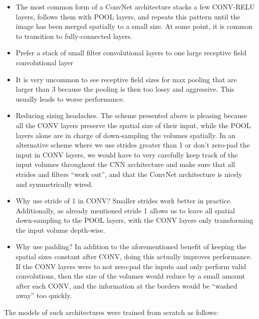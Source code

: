 \begin{itemize}
    \item The most common form of a ConvNet architecture stacks a few CONV-RELU layers, follows them with POOL layers, and repeats this pattern until the image has been merged spatially to a small size. At some point, it is common to transition to fully-connected layers.
    \item Prefer a stack of small filter convolutional layers to one large receptive field convolutional layer
    \item It is very uncommon to see receptive field sizes for max pooling that are larger than 3 because the pooling is then too lossy and aggressive. This usually leads to worse performance.
    \item Reducing sizing headaches. The scheme presented above is pleasing because all the CONV layers preserve the spatial size of their input, while the POOL layers alone are in charge of down-sampling the volumes spatially. In an alternative scheme where we use strides greater than 1 or don’t zero-pad the input in CONV layers, we would have to very carefully keep track of the input volumes throughout the CNN architecture and make sure that all strides and filters “work out”, and that the ConvNet architecture is nicely and symmetrically wired.
    \item Why use stride of 1 in CONV? Smaller strides work better in practice. Additionally, as already mentioned stride 1 allows us to leave all spatial down-sampling to the POOL layers, with the CONV layers only transforming the input volume depth-wise.
    \item Why use padding? In addition to the aforementioned benefit of keeping the spatial sizes constant after CONV, doing this actually improves performance. If the CONV layers were to not zero-pad the inputs and only perform valid convolutions, then the size of the volumes would reduce by a small amount after each CONV, and the information at the borders would be “washed away” too quickly.
\end{itemize}

The models of such architectures were trained from scratch as follows:

